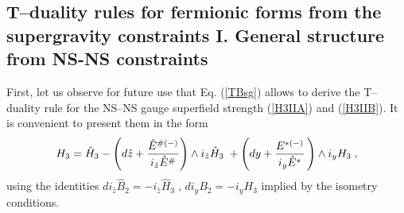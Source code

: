 \documentclass[a4paper,11pt]{article}
\begin{document}
\subsection{T--duality rules for fermionic forms from 
the supergravity constraints I. General structure from NS-NS constraints }

First, 
let us observe for  future use that Eq. (\ref{TBsg}) allows to derive the 
T--duality rule for the NS--NS gauge superfield strength (\ref{H3IIA}) and 
(\ref{H3IIB}). It is convenient to present them in the form  
\begin{equation}
\label{H3=hH3} 
H_3 = \hat{H}_3 
-  \left(d\hat{z} + 
{\hat{E}^{ {\#}(-)}\over i_{\hat{z}}\hat{E}^{ {\#}}} 
\right)\wedge i_{\hat{z}} \hat{H}_3 \; + 
 \left(dy +  {{E}^{ {*}(-)}\over i_{y}\hat{E}^{ {*}}} \,
\right)\wedge i_y H_3  \; , 
\end{equation}
using the identities $d i_{\hat{z}} \hat{B}_2= - 
i_{\hat{z}} \hat{H}_3\;$,  $di_yB_2= - i_yH_3$ 
implied by the isometry conditions. 
\end{document}
